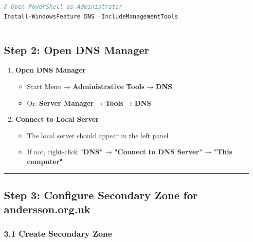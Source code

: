 \begin{lstlisting}[language=powershell]
# Open PowerShell as Administrator
Install-WindowsFeature DNS -IncludeManagementTools
\end{lstlisting}

\begin{center}\rule{0.5\linewidth}{0.5pt}\end{center}

\subsection{Step 2: Open DNS Manager}\label{step-2-open-dns-manager}

\begin{enumerate}
\def\labelenumi{\arabic{enumi}.}
\tightlist
\item
  \textbf{Open DNS Manager}

  \begin{itemize}
  \tightlist
  \item
    Start Menu → \textbf{Administrative Tools} → \textbf{DNS}
  \item
    Or: \textbf{Server Manager} → \textbf{Tools} → \textbf{DNS}
  \end{itemize}
\item
  \textbf{Connect to Local Server}

  \begin{itemize}
  \tightlist
  \item
    The local server should appear in the left panel
  \item
    If not, right-click \textbf{"DNS"} → \textbf{"Connect to DNS Server"} → \textbf{"This computer"}
  \end{itemize}
\end{enumerate}

\begin{center}\rule{0.5\linewidth}{0.5pt}\end{center}

\subsection{Step 3: Configure Secondary Zone for andersson.org.uk}\label{step-3-configure-secondary-zone-for-andersson.org.uk}

\subsubsection{3.1 Create Secondary Zone}\label{create-secondary-zone-andersson}

